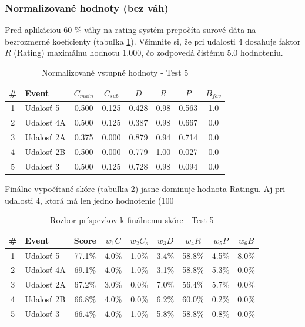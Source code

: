 \documentclass[12pt,a4paper]{article}
\begin{document}
\subsubsection{Normalizované hodnoty (bez váh)}

Pred aplikáciou 60 \% váhy na rating systém prepočíta surové dáta na bezrozmerné koeficienty (tabuľka \ref{tab:norm_test5}). Všimnite si, že pri udalosti 4 dosahuje faktor $R$ (Rating) maximálnu hodnotu 1.000, čo zodpovedá čistému 5.0 hodnoteniu.

\begin{table}[H]
\centering
\small
\begin{tabular}{|c|l|c|c|c|c|c|c|}
\hline
\textbf{\#} & \textbf{Event} & $C_{main}$ & $C_{sub}$ & $D$ & $R$ & $P$ & $B_{fav}$ \\
\hline
1 & Udalosť 5  & 0.500 & 0.125 & 0.428 & 0.98 & 0.563 & 1.0 \\
2 & Udalosť 4A & 0.500 & 0.125 & 0.387 & 0.98 & 0.667 & 0.0 \\
3 & Udalosť 2A & 0.375 & 0.000 & 0.879 & 0.94 & 0.714 & 0.0 \\
4 & Udalosť 2B & 0.500 & 0.000 & 0.779 & 1.00 & 0.027 & 0.0 \\
5 & Udalosť 3  & 0.500 & 0.125 & 0.728 & 0.98 & 0.094 & 0.0 \\
\hline
\end{tabular}
\caption{Normalizované vstupné hodnoty - Test 5}
\label{tab:norm_test5}
\end{table}

Finálne vypočítané skóre (tabuľka \ref{tab:vysledky_test5}) jasne dominuje hodnota Ratingu. Aj pri udalosti 4, ktorá má len jedno hodnotenie (100 %

\begin{table}[H]
\centering
\small
\begin{tabular}{|c|l|c|c|c|c|c|c|c|}
\hline
\textbf{\#} & \textbf{Event} & \textbf{Score} & $w_1 C$ & $w_2 C_s$ & $w_3 D$ & $w_4 R$ & $w_5 P$ & $w_6 B$ \\
\hline
1 & Udalosť 5  & 77.1\% & 4.0\% & 1.0\% & 3.4\% & 58.8\% & 4.5\% & 8.0\% \\
2 & Udalosť 4A & 69.1\% & 4.0\% & 1.0\% & 3.1\% & 58.8\% & 5.3\% & 0.0\% \\
3 & Udalosť 2A & 67.2\% & 3.0\% & 0.0\% & 7.0\% & 56.4\% & 5.7\% & 0.0\% \\
4 & Udalosť 2B & 66.8\% & 4.0\% & 0.0\% & 6.2\% & 60.0\% & 0.2\% & 0.0\% \\
5 & Udalosť 3  & 66.4\% & 4.0\% & 1.0\% & 5.8\% & 58.8\% & 0.8\% & 0.0\% \\
\hline
\end{tabular}
\caption{Rozbor príspevkov k finálnemu skóre - Test 5}
\label{tab:vysledky_test5}
\end{table}
\end{document}
